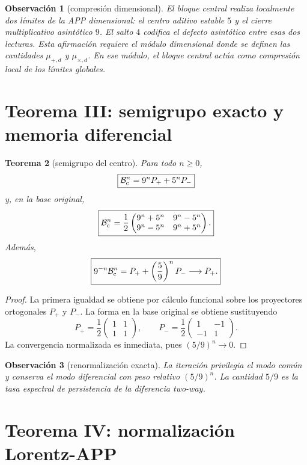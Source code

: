 \documentclass[11pt,a4paper]{article}
\newtheorem{teorema}{Teorema}
\newtheorem{observacion}[teorema]{Observaci\'on}
\newcommand{\Bc}{\mathcal B_{\rm c}}
\begin{document}
\begin{observacion}[compresi\'on dimensional]
El bloque central realiza localmente dos l\'imites de la APP dimensional: el centro aditivo estable \(5\) y el cierre multiplicativo asint\'otico \(9\). El salto \(4\) codifica el defecto asint\'otico entre esas dos lecturas. Esta afirmaci\'on requiere el m\'odulo dimensional donde se definen las cantidades \(\mu_{+,d}\) y \(\mu_{\times,d}\). En ese m\'odulo, el bloque central act\'ua como compresi\'on local de los l\'imites globales.
\end{observacion}

\section{Teorema III: semigrupo exacto y memoria diferencial}

\begin{teorema}[semigrupo del centro]
Para todo \(n\ge0\),
\[
\boxed{\Bc^n=9^nP_+ +5^nP_-}
\]
y, en la base original,
\[
\boxed{
\Bc^n=\frac12
\begin{pmatrix}
9^n+5^n&9^n-5^n\\
9^n-5^n&9^n+5^n
\end{pmatrix}.}
\]
Adem\'as,
\[
\boxed{9^{-n}\Bc^n=P_+ +\left(\frac59\right)^nP_-\longrightarrow P_+.}
\]
\end{teorema}

\begin{proof}
La primera igualdad se obtiene por c\'alculo funcional sobre los proyectores ortogonales \(P_+\) y \(P_-\). La forma en la base original se obtiene sustituyendo
\[
P_+=\frac12\begin{pmatrix}1&1\\1&1\end{pmatrix},\qquad
P_-=\frac12\begin{pmatrix}1&-1\\-1&1\end{pmatrix}.
\]
La convergencia normalizada es inmediata, pues \((5/9)^n\to0\).
\end{proof}

\begin{observacion}[renormalizaci\'on exacta]
La iteraci\'on privilegia el modo com\'un y conserva el modo diferencial con peso relativo \((5/9)^n\). La cantidad \(5/9\) es la tasa espectral de persistencia de la diferencia two-way.
\end{observacion}

\section{Teorema IV: normalizaci\'on Lorentz-APP}
\end{document}
